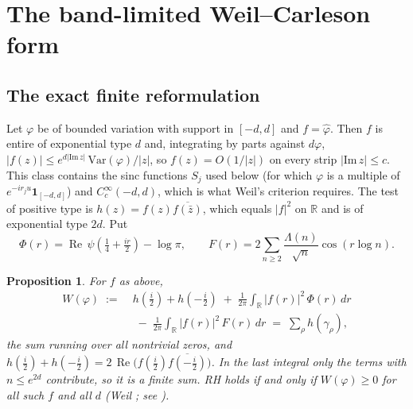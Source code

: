 \documentclass[11pt]{amsart}
\newtheorem{proposition}[theorem]{Proposition}
\theoremstyle{definition}
\theoremstyle{remark}
\newcommand{\re}{\operatorname{Re}}
\begin{document}
\section{The band-limited Weil--Carleson form}\label{sec:form}

\subsection{The exact finite reformulation}
Let $\varphi$ be of bounded variation with support in $[-d,d]$ and $f=\hat\varphi$. Then $f$ is entire of
exponential type $d$ and, integrating by parts against $d\varphi$, $|f(z)|\le e^{d|\mathrm{Im}\,z|}\,
\mathrm{Var}(\varphi)/|z|$, so $f(z)=O(1/|z|)$ on every strip $|\mathrm{Im}\,z|\le c$. This class contains the
sinc functions $S_j$ used below (for which $\varphi$ is a multiple of $e^{-ir_ju}\mathbf 1_{[-d,d]}$) and
$C_c^\infty(-d,d)$, which is what Weil's criterion requires. The test of positive type is
$h(z)=f(z)\overline{f(\bar z)}$, which equals $|f|^2$ on $\mathbb R$ and is of exponential type $2d$. Put
\begin{equation}\label{eq:PhiF}
\Phi(r)=\re\,\psi\!\left(\tfrac14+\tfrac{ir}{2}\right)-\log\pi,\qquad
F(r)=2\sum_{n\ge 2}\frac{\Lambda(n)}{\sqrt n}\cos(r\log n).
\end{equation}

\begin{proposition}\label{prop:trunc}
For $f$ as above,
\begin{equation}\label{eq:Wphi}
\begin{aligned}W(\varphi)\;:=\;&h(\tfrac i2)+h(-\tfrac i2)\;+\;\frac1{2\pi}\int_{\mathbb R}|f(r)|^2\,\Phi(r)\,dr\\
&\;-\;\frac1{2\pi}\int_{\mathbb R}|f(r)|^2\,F(r)\,dr \;=\;\sum_{\rho}h(\gamma_\rho),\end{aligned}
\end{equation}
the sum running over all nontrivial zeros, and $h(\frac i2)+h(-\frac i2)=2\,\re\big(f(\tfrac i2)\overline{f(-\tfrac i2)}\big)$.
In the last integral only the terms with $n\le e^{2d}$ contribute, so it is a finite sum. RH holds if and
only if $W(\varphi)\ge0$ for all such $f$ and all $d$ \textup{(}Weil \cite{Weil1952}; see
\cite{Bombieri2000}\textup{)}.
\end{proposition}
\end{document}
